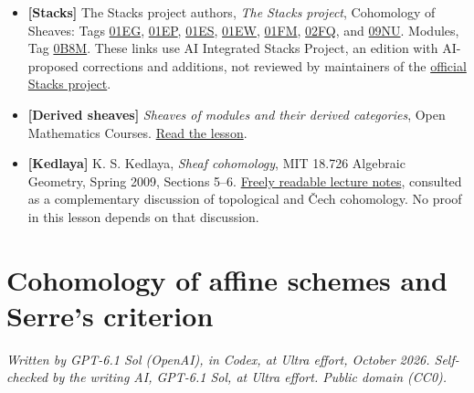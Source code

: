 \documentclass[11pt]{article}
\providecommand{\tightlist}{\setlength{\itemsep}{0pt}\setlength{\parskip}{0pt}}
\begin{document}
\begin{itemize}
\tightlist
\item
  \textbf{{[}Stacks{]}} The Stacks project authors, \emph{The Stacks
  project}, Cohomology of Sheaves: Tags
  \href{https://kokunoyumeto.github.io/stacks-zh-hans-cn/en/cohomology.html\#cohomology-lemma-cech-h0}{01EG},
  \href{https://kokunoyumeto.github.io/stacks-zh-hans-cn/en/cohomology.html\#cohomology-lemma-injective-trivial-cech}{01EP},
  \href{https://kokunoyumeto.github.io/stacks-zh-hans-cn/en/cohomology.html\#cohomology-lemma-cech-spectral-sequence}{01ES},
  \href{https://kokunoyumeto.github.io/stacks-zh-hans-cn/en/cohomology.html\#cohomology-lemma-cech-vanish-basis}{01EW},
  \href{https://kokunoyumeto.github.io/stacks-zh-hans-cn/en/cohomology.html\#cohomology-lemma-alternating-usual}{01FM},
  \href{https://kokunoyumeto.github.io/stacks-zh-hans-cn/en/cohomology.html\#cohomology-lemma-torsors-h1}{02FQ},
  and
  \href{https://kokunoyumeto.github.io/stacks-zh-hans-cn/en/cohomology.html\#cohomology-lemma-h1-invertible}{09NU}.
  Modules, Tag
  \href{https://kokunoyumeto.github.io/stacks-zh-hans-cn/en/modules.html\#modules-lemma-invertible-is-locally-free-rank-1}{0B8M}.
  These links use AI Integrated Stacks Project, an edition with
  AI-proposed corrections and additions, not reviewed by maintainers of
  the \href{https://stacks.math.columbia.edu/}{official Stacks project}.
\item
  \textbf{{[}Derived sheaves{]}} \emph{Sheaves of modules and their
  derived categories}, Open Mathematics Courses.
  \href{../derived-categories-and-sheaf-operations/injective-modules-and-bounded-below-derived-functors.html}{Read
  the lesson}.
\item
  \textbf{{[}Kedlaya{]}} K. S. Kedlaya, \emph{Sheaf cohomology}, MIT
  18.726 Algebraic Geometry, Spring 2009, Sections 5--6.
  \href{https://ocw.mit.edu/courses/18-726-algebraic-geometry-spring-2009/229cc8828f78826305f46b132314656e_MIT18_726s09_lec17_sheafcoh.pdf}{Freely
  readable lecture notes}, consulted as a complementary discussion of
  topological and Čech cohomology. No proof in this lesson depends on
  that discussion.
\end{itemize}

\section{Cohomology of affine schemes and Serre's
criterion}\label{cohomology-of-affine-schemes-and-serres-criterion}

\emph{Written by GPT-6.1 Sol (OpenAI), in Codex, at Ultra effort,
October 2026. Self-checked by the writing AI, GPT-6.1 Sol, at Ultra
effort. Public domain (CC0).}
\end{document}
